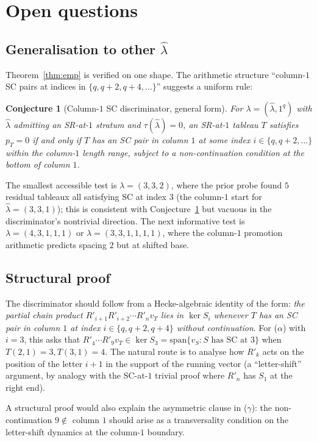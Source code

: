 \documentclass[11pt]{article}
\newtheorem{conjecture}[theorem]{Conjecture}
\theoremstyle{definition}
\newcommand{\la}{\lambda}
\newcommand{\hla}{\hat{\lambda}}
\begin{document}
\section{Open questions}

\subsection{Generalisation to other $\hla$}
Theorem~\ref{thm:emp} is verified on one shape. The arithmetic
structure ``column-$1$ SC pairs at indices in $\{q, q+2, q+4, \ldots\}$''
suggests a uniform rule:

\begin{conjecture}[Column-$1$ SC discriminator, general form]
\label{conj:general}
For $\la = (\hla, 1^q)$ with $\hla$ admitting an SR-at-$1$ stratum
and $\tau(\hla) = 0$, an SR-at-$1$ tableau $T$ satisfies $p_T = 0$ if
and only if $T$ has an SC pair in column $1$ at some index $i \in
\{q, q + 2, \ldots\}$ within the column-$1$ length range, subject to a
non-continuation condition at the bottom of column $1$.
\end{conjecture}

\noindent The smallest accessible test is $\la = (3, 3, 2)$, where
the prior probe found $5$ residual tableaux all satisfying SC at
index $3$ (the column-$1$ start for $\hla = (3, 3, 1)$); this is
consistent with Conjecture~\ref{conj:general} but vacuous in the
discriminator's nontrivial direction. The next informative test is
$\la = (4, 3, 1, 1, 1)$ or $\la = (3, 3, 1, 1, 1, 1)$, where the
column-$1$ promotion arithmetic predicts spacing $2$ but at shifted
base.

\subsection{Structural proof}
The discriminator should follow from a Hecke-algebraic identity of
the form: \emph{the partial chain product
$R'_{i+1} R'_{i+2} \cdots R'_n v_T$ lies in $\ker S_i$ whenever $T$
has an SC pair in column $1$ at index $i \in \{q, q + 2, q + 4\}$
without continuation}.
For ($\alpha$) with $i = 3$, this asks that
$R'_4 \cdots R'_9 v_T \in \ker S_3 = \mathrm{span}\{v_S : S \text{ has
SC at } 3\}$ when $T(2, 1) = 3, T(3, 1) = 4$. The natural route is to
analyse how $R'_k$ acts on the position of the letter $i + 1$ in the
support of the running vector (a ``letter-shift'' argument, by
analogy with the SC-at-$1$ trivial proof where $R'_n$ has $S_1$ at
the right end).

A structural proof would also explain the asymmetric clause in
($\gamma$): the non-continuation $9 \notin$ column $1$ should arise
as a transversality condition on the letter-shift dynamics at the
column-$1$ boundary.
\end{document}
